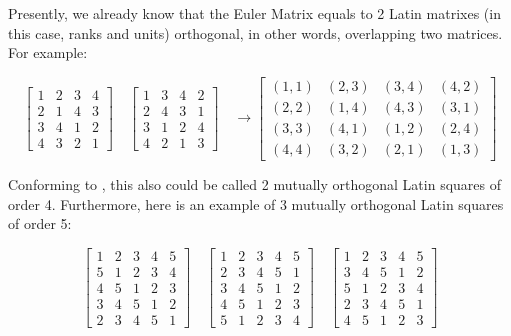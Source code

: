 \documentclass[12pt]{article}
\begin{document}
Presently, we already know that the Euler Matrix equals to 2 Latin matrixes (in this case, ranks and units) orthogonal, in other words, overlapping two matrices. For example:


\[ \begin{bmatrix} 1 & 2 & 3 & 4\\2 & 1 & 4 & 3\\3 & 4 & 1 & 2\\4 & 3 & 2 & 1 \end{bmatrix} \quad
   \begin{bmatrix} 1 & 3 & 4 & 2\\2 & 4 & 3 & 1\\3 & 1 & 2 & 4\\4 & 2 & 1 & 3 \end{bmatrix} \quad
\rightarrow
   \begin{bmatrix}(1,1) & (2,3) & (3,4) & (4,2)\\(2,2) & (1,4) & (4,3) & (3,1)\\
                  (3,3) & (4,1) & (1,2) & (2,4)\\(4,4) & (3,2) & (2,1) & (1,3) \end{bmatrix} \]


Conforming to \cite{ref1}, this also could be called 2 mutually orthogonal Latin squares of order 4. Furthermore, here is an example of 3 mutually orthogonal Latin squares
of order 5:


\[ \begin{bmatrix} 1 & 2 & 3 & 4 & 5\\5 & 1 & 2 & 3 & 4\\4 & 5 & 1 & 2 & 3\\
                   3 & 4 & 5 & 1 & 2\\2 & 3 & 4 & 5 & 1 \end{bmatrix} \quad
   \begin{bmatrix} 1 & 2 & 3 & 4 & 5\\2 & 3 & 4 & 5 & 1\\3 & 4 & 5 & 1 & 2\\
                   4 & 5 & 1 & 2 & 3\\5 & 1 & 2 & 3 & 4 \end{bmatrix} \quad
   \begin{bmatrix} 1 & 2 & 3 & 4 & 5\\3 & 4 & 5 & 1 & 2\\5 & 1 & 2 & 3 & 4\\
                   2 & 3 & 4 & 5 & 1\\4 & 5 & 1 & 2 & 3 \end{bmatrix} \]
\end{document}
